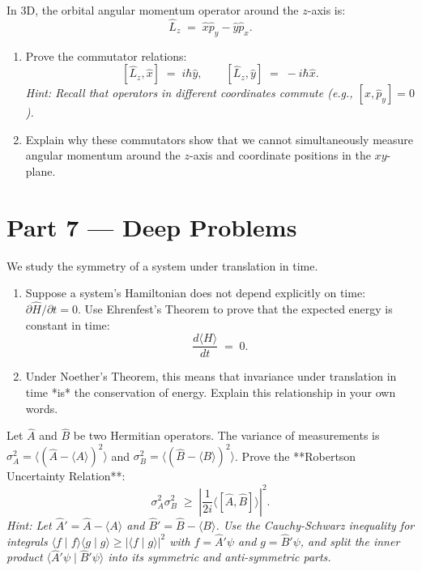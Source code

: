 \documentclass[12pt, a4paper, twoside]{book}
\newcounter{problem}[chapter]
\begin{document}
\begin{problem}
In 3D, the orbital angular momentum operator around the $z$-axis is:
\[
  \hat{L}_z \;=\; \hat{x}\hat{p}_y - \hat{y}\hat{p}_x.
\]
\begin{enumerate}[label=(\alph*)]
  \item Prove the commutator relations:
  \[
    [\hat{L}_z, \hat{x}] \;=\; i\hbar \hat{y}, \qquad [\hat{L}_z, \hat{y}] \;=\; -i\hbar \hat{x}.
  \]
  \textit{Hint: Recall that operators in different coordinates commute (e.g., $[\hat{x}, \hat{p}_y] = 0$).}
  \item Explain why these commutators show that we cannot simultaneously measure angular momentum around the $z$-axis and coordinate positions in the $xy$-plane.
\end{enumerate}
\end{problem}

\newpage

\section{Part 7 --- Deep Problems}

\begin{deepproblem}
We study the symmetry of a system under translation in time.
\begin{enumerate}[label=(\alph*)]
  \item Suppose a system's Hamiltonian does not depend explicitly on time: $\partial\hat{H}/\partial t = 0$.
  Use Ehrenfest's Theorem to prove that the expected energy is constant in time:
  \[
    \frac{d\langle H \rangle}{dt} \;=\; 0.
  \]
  \item Under Noether's Theorem, this means that invariance under translation in time *is* the conservation of energy. Explain this relationship in your own words.
\end{enumerate}
\end{deepproblem}

\begin{deepproblem}
Let $\hat{A}$ and $\hat{B}$ be two Hermitian operators. The variance of measurements is $\sigma_A^2 = \langle (\hat{A} - \langle A \rangle)^2 \rangle$ and $\sigma_B^2 = \langle (\hat{B} - \langle B \rangle)^2 \rangle$.
Prove the **Robertson Uncertainty Relation**:
\[
  \sigma_A^2 \sigma_B^2 \;\ge\; \left| \frac{1}{2i} \langle [\hat{A}, \hat{B}] \rangle \right|^2.
\]
\textit{Hint: Let $\hat{A}' = \hat{A} - \langle A \rangle$ and $\hat{B}' = \hat{B} - \langle B \rangle$. Use the Cauchy-Schwarz inequality for integrals $\langle f \mid f \rangle \langle g \mid g \rangle \ge |\langle f \mid g \rangle|^2$ with $f = \hat{A}'\psi$ and $g = \hat{B}'\psi$, and split the inner product $\langle \hat{A}'\psi \mid \hat{B}'\psi \rangle$ into its symmetric and anti-symmetric parts.}
\end{deepproblem}
\end{document}
